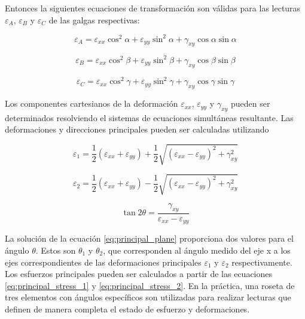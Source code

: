 Entonces la siguientes ecuaciones de transformación son válidas para las lecturas $\varepsilon_{A}$, 
$\varepsilon_{B}$ y $\varepsilon_{C}$ de las galgas respectivas:

\begin{equation}
\varepsilon_A = \varepsilon_{xx} \cos^2\alpha + \varepsilon_{yy} \sin^2\alpha + \gamma_{xy} \cos\alpha \sin\alpha
\end{equation}

\begin{equation}
\varepsilon_B = \varepsilon_{xx} \cos^2\beta + \varepsilon_{yy} \sin^2\beta + \gamma_{xy} \cos\beta \sin\beta
\end{equation}

\begin{equation}
\varepsilon_C = \varepsilon_{xx} \cos^2\gamma + \varepsilon_{yy} \sin^2\gamma + \gamma_{xy} \cos\gamma \sin\gamma
\end{equation}

Los componentes cartesianos de la deformación $\varepsilon_{xx}$, $\varepsilon_{yy}$ y $\gamma_{xy}$ pueden 
ser determinados resolviendo el sistemas de ecuaciones simultáneas resultante. Las deformaciones 
y direcciones principales pueden ser calculadas utilizando 

\begin{equation}\label{eq:principal_strain_1}
\varepsilon_1 = \frac{1}{2} \left( \varepsilon_{xx} + \varepsilon_{yy} \right) + 
\frac{1}{2} \sqrt{\left( \varepsilon_{xx} - \varepsilon_{yy} \right)^2 + \gamma_{xy}^2 }
\end{equation}

\begin{equation}\label{eq:principal_strain_2}
\varepsilon_2 = \frac{1}{2} \left( \varepsilon_{xx} + \varepsilon_{yy} \right) - 
\frac{1}{2} \sqrt{\left( \varepsilon_{xx} - \varepsilon_{yy} \right)^2 + \gamma_{xy}^2 }
\end{equation}

\begin{equation}\label{eq:principal_plane}
\tan 2\theta = \frac{\gamma_{xy}}{\varepsilon_{xx} - \varepsilon_{yy}}
\end{equation}

La solución de la ecuación \ref{eq:principal_plane} proporciona dos valores para el ángulo $\theta$. Estos son 
$\theta_1$ y $\theta_2$, que corresponden al ángulo medido del eje x a los ejes correspondientes de las 
deformaciones principales $\varepsilon_1$ y $\varepsilon_2$ respectivamente.\\

Los esfuerzos principales pueden ser calculados a partir de las ecuaciones \ref{eq:principal_stress_1} y 
\ref{eq:principal_stress_2}. En la práctica, una roseta de tres elementos con ángulos específicos son 
utilizadas para realizar lecturas que definen de manera completa el estado de esfuerzo y deformaciones.
